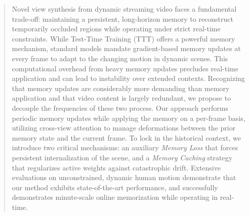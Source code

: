 \begin{abstract}
Novel view synthesis from dynamic streaming video faces a fundamental trade-off: maintaining a persistent, long-horizon memory to reconstruct temporarily occluded regions while operating under strict real-time constraints. While Test-Time Training (TTT) offers a powerful memory mechanism, standard models mandate gradient-based memory updates at every frame to adapt to the changing motion in dynamic scenes. This computational overhead from heavy memory updates precludes real-time application and can lead to instability over extended contexts. Recognizing that memory updates are considerably more demanding than memory application and that video content is largely redundant, we propose to decouple the frequencies of these two process. Our approach performs periodic memory updates while applying the memory on a per-frame basis, utilizing cross-view attention to manage deformations between the prior memory state and the current frame. To lock in the historical context, we introduce two critical mechanisms: an auxiliary \emph{Memory Loss} that forces persistent internalization of the scene, and a \emph{Memory Caching} strategy that regularizes active weights against catastrophic drift. Extensive evaluations on unconstrained, dynamic human motion demonstrate that our method exhibits state-of-the-art performance, and successfully demonstrates minute-scale online memorization while operating in real-time.


\end{abstract}
